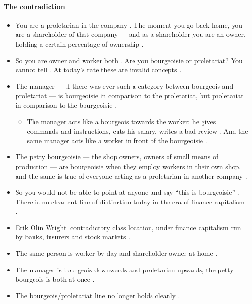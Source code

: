 \paragraph{The contradiction}
\begin{itemize}
    \item You are a proletarian in the company . The moment you go back home, you are a shareholder of that company --- and as a shareholder you are an owner, holding a certain percentage of ownership .
    \item So you are owner and worker both . Are you bourgeoisie or proletariat? You cannot tell . At today's rate these are invalid concepts .
    \item The manager --- if there was ever such a category between bourgeois and proletariat --- is bourgeoisie in comparison to the proletariat, but proletariat in comparison to the bourgeoisie .
    \begin{itemize}
        \item The manager acts like a bourgeois towards the worker: he gives commands and instructions, cuts his salary, writes a bad review . And the same manager acts like a worker in front of the bourgeoisie .
    \end{itemize}
    \item The petty bourgeoisie --- the shop owners, owners of small means of production --- are bourgeoisie when they employ workers in their own shop, and the same is true of everyone acting as a proletarian in another company .
    \item So you would not be able to point at anyone and say ``this is bourgeoisie'' . There is no clear-cut line of distinction today in the era of finance capitalism .
\end{itemize}

\begin{QuickRevision}
\begin{itemize}
    \item Erik Olin Wright: contradictory class location, under finance capitalism run by banks, insurers and stock markets .
    \item The same person is worker by day and shareholder-owner at home .
    \item The manager is bourgeois downwards and proletarian upwards; the petty bourgeois is both at once .
    \item The bourgeois/proletariat line no longer holds cleanly .
\end{itemize}
\end{QuickRevision}

